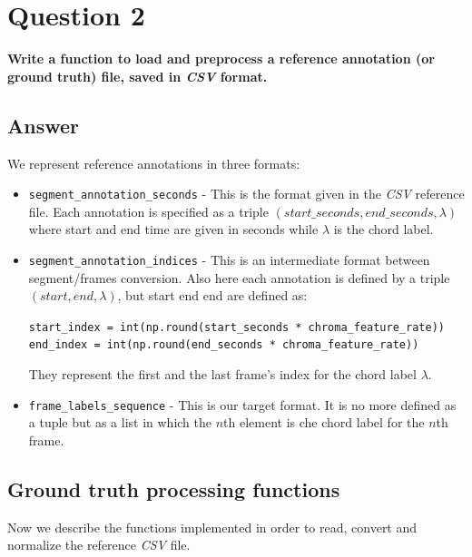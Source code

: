 \documentclass[
	12pt, %
]{fphw}
\begin{document}
\newpage
\section*{\color{red}Question 2}

\begin{problem}
	\textbf{Write a function to load and preprocess a reference annotation (or ground truth) file, saved in \emph{CSV} format.}
\end{problem}

\subsection*{\color{blue}Answer} We represent reference annotations in three formats:
\begin{itemize}
	\item \verb|segment_annotation_seconds| - This is the format given in the \emph{CSV} reference file. Each annotation is specified as a triple $(start\_seconds, end\_seconds, \lambda)$ where start and end time are given in seconds while $\lambda$ is the chord label.
	\item \verb|segment_annotation_indices| - This is an intermediate format between segment/frames conversion. Also here each annotation is defined by a triple $(start, end, \lambda)$, but start end end are defined as:
	\begin{center}
		\verb|start_index = int(np.round(start_seconds * chroma_feature_rate))|
        \verb|end_index = int(np.round(end_seconds * chroma_feature_rate))|
	\end{center}	
They represent the first and the last frame's index for the chord label $\lambda$.
	\item \verb|frame_labels_sequence| - This is our target format. It is no more defined as a tuple but as a list in which the $n$th element is che chord label for the $n$th frame.
\end{itemize}

\subsection*{Ground truth processing functions}

Now we describe the functions implemented in order to read, convert and normalize the reference \emph{CSV} file.
\end{document}
